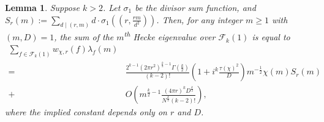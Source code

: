 \documentclass[12pt, reqno,oneside]{amsart}
\theoremstyle{plain}
\newtheorem{lemma}[theorem]{Lemma}
\theoremstyle{definition}
\theoremstyle{remark}
\theoremstyle{plain}
\numberwithin{equation}{section}
\begin{document}
\begin{lemma}\label{lemma:1}
Suppose $k>2$. Let $\sigma_1$ be the divisor sum function, and $S_r(m) := \sum_{d \mid (r,m)}d \cdot \sigma_1\left(\left(r,\frac{rm}{d^2}\right)\right)$. Then, for any integer $m\geq1$ with $(m,D) = 1$, the sum of the $m$\textsuperscript{th} Hecke eigenvalue over $\mathcal{F}_k(1)$ is equal to
\begin{align}\nonumber
\sum_{f\in\mathcal{F}_k(1)}w_{\chi,r}(f)\lambda_f(m) & \\
\nonumber
= \ & \frac{2^{k-1}(2\pi r^2)^{\frac{k}{2}-1}\Gamma\left(\frac{k}{2}\right)}{(k-2)!}\left(1+i^k\frac{\tau(\chi)^2}{D}\right) m^{-\frac{1}{2}} \chi(m)  S_r(m)\\
\label{eq:sum-1}
+ \ & O\left(m^{\frac{k}{2}-1}\frac{(4\pi r)^{k}D^{\frac{k}{2}}}{N^{\frac{k}{2}}(k-2)!}\right),
\end{align}
where the implied constant depends only on $r$ and $D$. 
\end{lemma}
\end{document}
